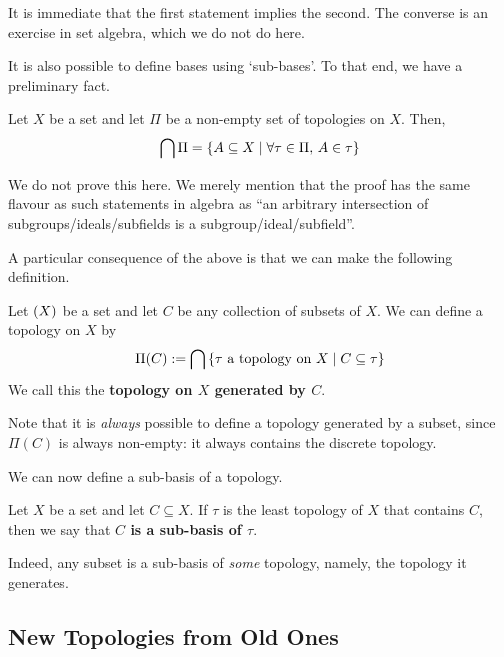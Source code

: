 It is immediate that the first statement implies the second. The converse is an exercise in set algebra, which we do not do here.

It is also possible to define bases using `sub-bases'. To that end, we have a preliminary fact.

\begin{boxlemma}
    Let $X$ be a set and let $\Pi$ be a non-empty set of topologies on $X$. Then,
    \begin{align*}
        \bigcap \Pi = \left\{ A \subseteq X \; \middle\vert \; \forall \tau \in \Pi, \, A \in \tau \right\}
    \end{align*}
\end{boxlemma}

We do not prove this here. We merely mention that the proof has the same flavour as such statements in algebra as ``an arbitrary intersection of subgroups/ideals/subfields is a subgroup/ideal/subfield''.

A particular consequence of the above is that we can make the following definition.

\begin{boxdefinition}
    Let $\left( X \right)$ be a set and let $C$ be any collection of subsets of $X$. We can define a topology on $X$ by
    \begin{align*}
        \Pi(C) := \bigcap \left\{ \tau \text{ a topology on } X \; \middle\vert \; C \subseteq \tau \right\}
    \end{align*}
    We call this the \textbf{topology on $X$ generated by $C$}.
\end{boxdefinition}

Note that it is \textit{always} possible to define a topology generated by a subset, since $\Pi(C)$ is always non-empty: it always contains the discrete topology.

We can now define a sub-basis of a topology.

\begin{boxdefinition}
    Let $X$ be a set and let $C \subseteq X$. If $\tau$ is the least topology of $X$ that contains $C$, then we say that \textbf{$C$ is a sub-basis of $\tau$}.
\end{boxdefinition}

Indeed, any subset is a sub-basis of \textit{some} topology, namely, the topology it generates.

\subsection{New Topologies from Old Ones}

